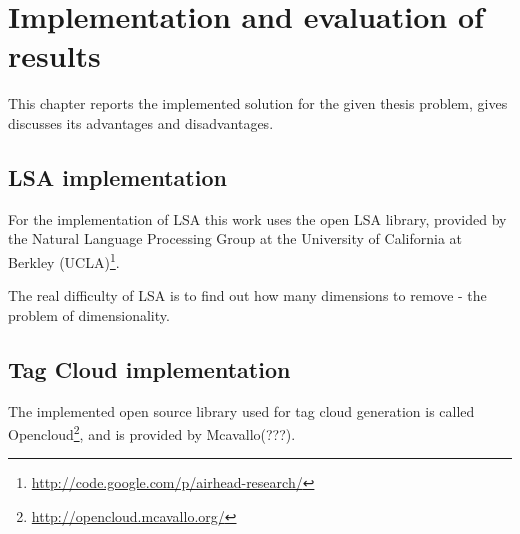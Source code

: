 \chapter{Implementation and evaluation of results}
\label{sec:implementation}

\begin{summary}
This chapter reports the implemented solution for the given thesis problem, gives discusses its advantages and disadvantages.
\end{summary}

\section{LSA implementation}
\label{sec:implementation:lsa_impl}
For the implementation of LSA this work uses the open LSA library, provided by the Natural Language Processing Group at the University of California at Berkley (UCLA)\footnote{\url{http://code.google.com/p/airhead-research/}}.

The real difficulty of LSA is to find out how many dimensions to remove - the problem of dimensionality.

\section{Tag Cloud implementation}
\label{sec:implementation:tag_cloud}
The implemented open source library used for tag cloud generation is called Opencloud\footnote{\url{http://opencloud.mcavallo.org/}}, and is provided by Mcavallo(???).

